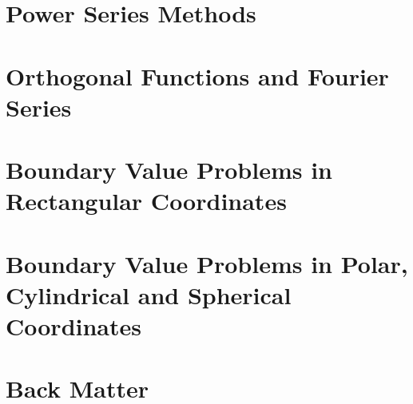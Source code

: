 \documentclass{tufte-book}
\theoremstyle{break}
\begin{document}
\part{Power Series Methods}













\part{Orthogonal Functions and Fourier Series}









\part{Boundary Value Problems in Rectangular Coordinates}














\part{Boundary Value Problems in Polar, Cylindrical and Spherical Coordinates}









\part{Back Matter}
\backmatter





\appendix
\appendixpage
\noappendicestocpagenum
\addappheadtotoc
\end{document}
